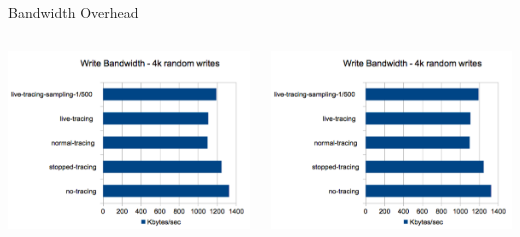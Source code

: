 \begin{frame}[t]{Bandwidth Overhead}
\begin{center}
\begin{columns}
    \begin{column}{0.5\textwidth}
        \begin{center}
            \includegraphics[scale=0.3]{images/4.png}
        \end{center}
    \end{column}
    \begin{column}{0.5\textwidth}
        \begin{center}
            \includegraphics[scale=0.3]{images/4.png}
        \end{center}
    \end{column}
\end{columns}
\end{center}
\end{frame}

